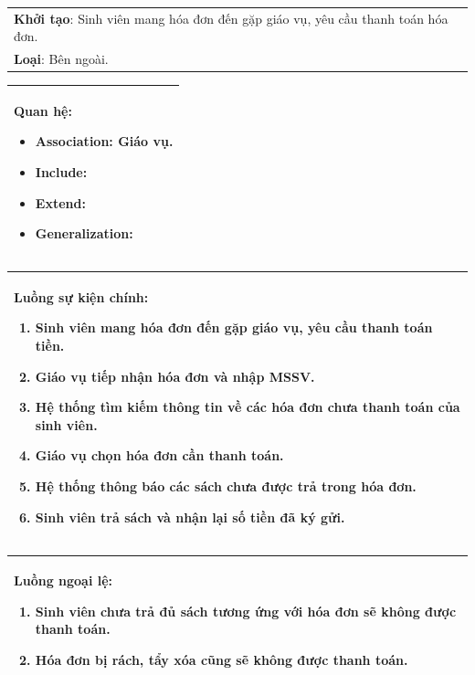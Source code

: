 \documentclass[12pt]{report}
\begin{document}
\begin{center}
\begin{tabular}{| m{15.9cm} |}
    \hline
    \textbf{Khởi tạo}: Sinh viên mang hóa đơn đến gặp giáo vụ, yêu cầu thanh toán hóa đơn. \\
    \textbf{Loại}: Bên ngoài.  \\
    \hline
\end{tabular}

\begin{tabular}{| m{15.9cm} |}
    \hline
    \textbf{Quan hệ}:
    \begin{itemize}
        \item Association: Giáo vụ. 
        \item Include: 
        \item Extend: 
        \item Generalization: 
    \end{itemize} \\
    \hline
\end{tabular}

\begin{tabular}{| m{15.9cm} |}
    \hline
    \textbf{Luồng sự kiện chính}:
    \begin{enumerate}
        \item Sinh viên mang hóa đơn đến gặp giáo vụ, yêu cầu thanh toán tiền. 
        \item Giáo vụ tiếp nhận hóa đơn và nhập MSSV. 
        \item Hệ thống tìm kiếm thông tin về các hóa đơn chưa thanh toán của sinh viên. 
        \item Giáo vụ chọn hóa đơn cần thanh toán. 
        \item Hệ thống thông báo các sách chưa được trả trong hóa đơn. 
        \item Sinh viên trả sách và nhận lại số tiền đã ký gửi. 
    \end{enumerate} \\
    \hline
\end{tabular}

\begin{tabular}{| m{15.9cm} |}
    \hline
    \textbf{Luồng ngoại lệ}:
    \begin{enumerate}
        \item Sinh viên chưa trả đủ sách tương ứng với hóa đơn sẽ không được thanh toán. 
        \item Hóa đơn bị rách, tẩy xóa cũng sẽ không được thanh toán. 
    \end{enumerate} \\
    \hline
\end{tabular}


\end{center}
\end{document}
